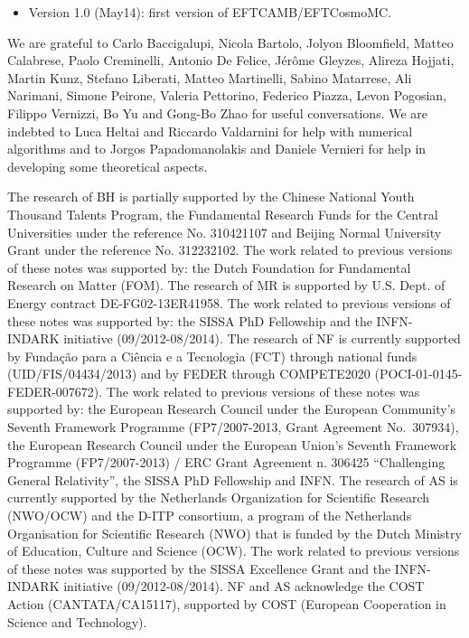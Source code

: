 \documentclass[prd,nofootinbib,showpacs]{revtex4}
\begin{document}
{\begin{itemize}
\begin{itemize}
\item EFTCAMB sources: LSS number counts, LSS weak lensing and all CMB cross-correlation functions in DE/MG models.
\end{itemize}
\item Version 1.0 (May14): first version of EFTCAMB/EFTCosmoMC.
\end{itemize}
%
\acknowledgments
%
We are grateful to Carlo Baccigalupi, Nicola Bartolo, Jolyon Bloomfield, Matteo Calabrese, Paolo Creminelli, Antonio De Felice, J\'er\^{o}me Gleyzes, Alireza Hojjati, Martin Kunz, Stefano Liberati, Matteo Martinelli, Sabino Matarrese, Ali Narimani, Simone Peirone, Valeria Pettorino, Federico Piazza, Levon Pogosian, Filippo Vernizzi, Bo Yu and Gong-Bo Zhao for useful conversations. We are indebted to Luca Heltai and Riccardo Valdarnini for help with numerical algorithms and to Jorgos Papadomanolakis and Daniele Vernieri for help in developing some theoretical aspects.

The research of BH is partially supported by the Chinese National Youth Thousand Talents Program, the Fundamental Research Funds for the Central Universities under the reference No. 310421107 and Beijing Normal University Grant under the reference No. 312232102. The work related to previous versions of these notes was supported by: the Dutch Foundation for Fundamental Research on Matter (FOM).
The research of MR is supported by U.S. Dept. of Energy contract DE-FG02-13ER41958. The work related to previous versions of these notes was supported by: the SISSA PhD Fellowship and the INFN-INDARK initiative (09/2012-08/2014).
The research of NF is currently supported by  Funda\c{c}\~{a}o para a  Ci\^{e}ncia e a Tecnologia (FCT) through national funds  (UID/FIS/04434/2013) and by FEDER through COMPETE2020  (POCI-01-0145-FEDER-007672). The  work related to previous versions of these notes was supported by: the European Research Council under the European Community's Seventh Framework Programme (FP7/2007-2013, Grant Agreement No.~307934), the European Research Council under the European Union’s Seventh Framework Programme (FP7/2007-2013) / ERC Grant Agreement n. 306425 “Challenging General Relativity”, the SISSA PhD Fellowship and INFN. 
The research of AS is currently supported by the Netherlands Organization for Scientific Research (NWO/OCW) and the D-ITP consortium, a program of the Netherlands Organisation for Scientific Research (NWO) that is funded by the Dutch Ministry of Education, Culture and Science (OCW). The  work related to previous versions of these notes was supported by the SISSA Excellence Grant and the INFN-INDARK  initiative (09/2012-08/2014).
NF and AS acknowledge the COST Action  (CANTATA/CA15117), supported by COST (European Cooperation in  Science and Technology).

}
\end{document}
